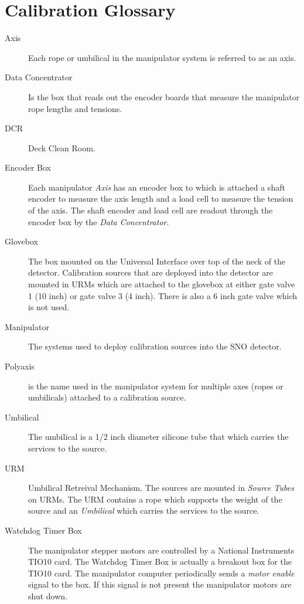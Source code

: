 

\chapter{Calibration Glossary}

\begin{description}

\item[Axis]
  Each rope or umbilical in the manipulator system is referred to
  as an axis.

\item[Data Concentrator]
  Is the box that reads out the encoder boards that measure the 
  manipulator rope lengths and tensions.


\item[DCR]
  Deck Clean Room.

\item[Encoder Box]
  Each manipulator {\em Axis} has an encoder box to which is attached
  a shaft encoder to measure the axis length and a load cell to measure
  the tension of the axis.  The shaft encoder and load cell are
  readout through the encoder box by the {\em Data Concentrator}.

\item[Glovebox]
  The box mounted on the Universal Interface over top of the 
neck of the detector.  Calibration sources that are deployed into
the detector are mounted in URMs which are attached to the glovebox
at either gate valve 1 (10 inch) or gate valve 3 (4 inch).  There
is also a 6 inch gate valve which is not used.

\item[Manipulator] The systems used to deploy calibration sources
  into the SNO detector.

\item[Polyaxis] is the name used in the manipulator system
  for multiple axes (ropes or umbilicals) attached to a calibration
  source.

\item[Umbilical]
  The umbilical is a 1/2 inch diameter silicone tube that which
  carries the services to the source.

\item[URM]
  Umbilical Retreival Mechanism.  The sources are mounted in
  {\em Source Tubes} on URMs.  The URM contains a rope which
  supports the weight of the source and an {\em Umbilical} which
  carries the services to the source.

\item[Watchdog Timer Box]
  The manipulator stepper motors are controlled by a National Instruments
  TIO10 card.  The Watchdog Timer Box is actually a breakout box for
  the TIO10 card.  The manipulator computer periodically sends a 
  {\em motor enable} signal to the box.  If this signal is not present
  the manipulator motors are shut down.



\end{description}

